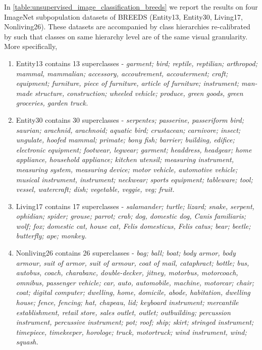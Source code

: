 \documentclass[runningheads]{llncs}
\begin{document}
In \cref{table:unsupervised_image_classification_breeds} we report the results on four ImageNet subpopulation datasets of BREEDS \cite{santurkar2020breeds} (Entity13, Entity30, Living17, Nonliving26). These datasets are accompanied by class hierarchies re-calibrated by \cite{santurkar2020breeds} such that classes on same hierarchy level are of the same visual granularity. More specifically, 
\begin{enumerate}
    \item Entity13 contains 13 superclasses - \textit{garment; bird; reptile, reptilian; arthropod; mammal, mammalian; accessory, accoutrement, accouterment; craft; equipment; furniture, piece of furniture, article of furniture; instrument; man-made structure, construction; wheeled vehicle; produce, green goods, green groceries, garden truck.}
    \item Entity30 contains 30 superclasses - \textit{serpentes; passerine, passeriform bird; saurian; arachnid, arachnoid; aquatic bird; crustacean; carnivore; insect; ungulate, hoofed mammal; primate; bony fish; barrier; building, edifice; electronic equipment; footwear, legwear; garment; headdress, headgear; home appliance, household appliance; kitchen utensil; measuring instrument, measuring system, measuring device; motor vehicle, automotive vehicle; musical instrument, instrument; neckwear; sports equipment; tableware; tool; vessel, watercraft; dish; vegetable, veggie, veg; fruit.}
    \item Living17 contains 17 superclasses - \textit{salamander; turtle; lizard; snake, serpent, ophidian; spider; grouse; parrot; crab; dog, domestic dog, Canis familiaris; wolf; fox; domestic cat, house cat, Felis domesticus, Felis catus; bear; beetle; butterfly; ape; monkey.}
    \item Nonliving26 contains 26 superclasses - \textit{bag; ball; boat; body armor, body armour, suit of armor, suit of armour, coat of mail, cataphract; bottle; bus, autobus, coach, charabanc, double-decker, jitney, motorbus, motorcoach, omnibus, passenger vehicle; car, auto, automobile, machine, motorcar; chair; coat; digital computer; dwelling, home, domicile, abode, habitation, dwelling house; fence, fencing; hat, chapeau, lid; keyboard instrument; mercantile establishment, retail store, sales outlet, outlet; outbuilding; percussion instrument, percussive instrument; pot; roof; ship; skirt; stringed instrument; timepiece, timekeeper, horologe; truck, motortruck; wind instrument, wind; squash.}
\end{enumerate}
\end{document}
